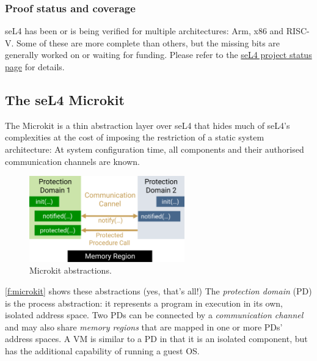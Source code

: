 \documentclass[english,a4paper,12pt]{report}
\newcommand{\SSect}[1]{\subsection{#1}}
\newcommand{\SSSect}[1]{\subsubsection*{#1}}
\newcommand{\SSect}[1]{\section{#1}}
\newcommand{\SSSect}[1]{\subsection*{#1}}
\begin{document}
  \SSSect{Proof status and coverage}

  seL4 has been or is being verified for multiple architectures: Arm,
  x86 and RISC-V. Some of these are more complete than others, but the
  missing bits are generally worked on or waiting for funding. Please
  refer to the
  \href{https://docs.sel4.systems/projects/sel4/status.html}{seL4
    project status page} for details.

  \SSect{The seL4 Microkit}\label{s:microkit}

  The Microkit is a thin abstraction layer over seL4 that hides much
  of seL4's complexities at the cost of imposing the restriction of a
  static system architecture: At system configuration time, all
  components and their authorised communication channels are known.

  \begin{figure}[b]
    \centering
    \includegraphics[width=0.6\textwidth]{microkit}
    \caption{Microkit abstractions.}
    \label{f:microkit}
  \end{figure}

  \autoref{f:microkit} shows these abstractions (yes, that's all!) The
  \emph{protection domain} (PD) is the process abstraction: it
  represents a program in execution in its own, isolated address
  space. Two PDs can be connected by a \emph{communication channel}
  and may also share \emph{memory regions} that are mapped in one or
  more PDs' address spaces. A VM is similar to a PD in that it is an
  isolated component, but has the additional capability of running a guest
  OS.
\end{document}

